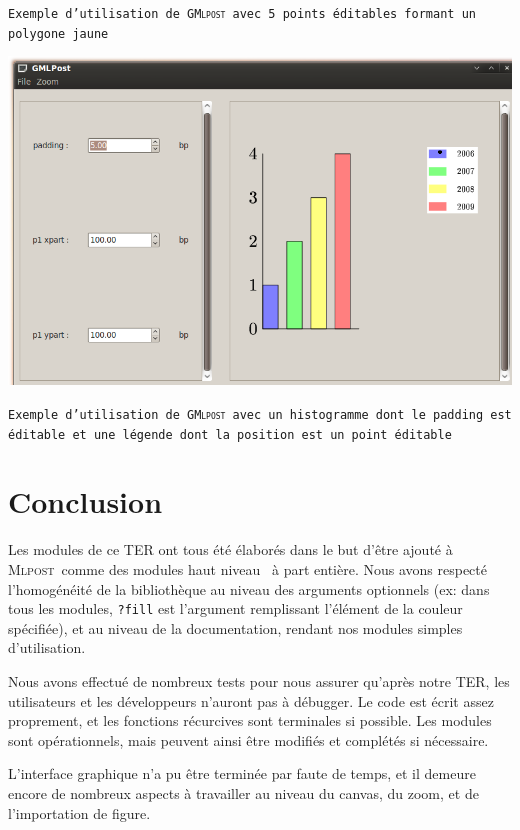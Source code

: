 \documentclass[a4paper,12pt]{article}
\newcommand{\mlpost}{\textsc{Mlpost}}
\newcommand{\gmlpost}{\textsc{GMlpost}}
\begin{document}
\begin{center}
\texttt{Exemple d'utilisation de \gmlpost\ avec 5 points éditables formant un polygone jaune} 
\end{center}

\includegraphics[scale=0.45]{screen2.png}

\begin{center}
\texttt{Exemple d'utilisation de \gmlpost\ avec un histogramme dont le padding est éditable et une légende dont la position est un point éditable } 
\end{center}

\section{Conclusion}
Les modules de ce TER ont tous été élaborés dans le but d'être ajouté à \mlpost\ comme des modules \og haut niveau \fg\ à part entière. Nous avons respecté l'homogénéité de la bibliothèque au niveau des arguments optionnels (ex: dans tous les modules, \texttt{?fill} est l'argument remplissant l'élément de la couleur spécifiée), et au niveau de la documentation, rendant nos modules simples d'utilisation.

Nous avons effectué de nombreux tests pour nous assurer qu'après notre TER, les utilisateurs et les développeurs n'auront pas à débugger. Le code est écrit assez proprement, et les fonctions récurcives sont terminales si possible.
Les modules sont opérationnels, mais peuvent ainsi être modifiés et complétés si nécessaire.

L'interface graphique n'a pu être terminée par faute de temps, et il demeure encore de nombreux aspects à travailler au niveau du canvas, du zoom, et de l'importation de figure.
\end{document}
